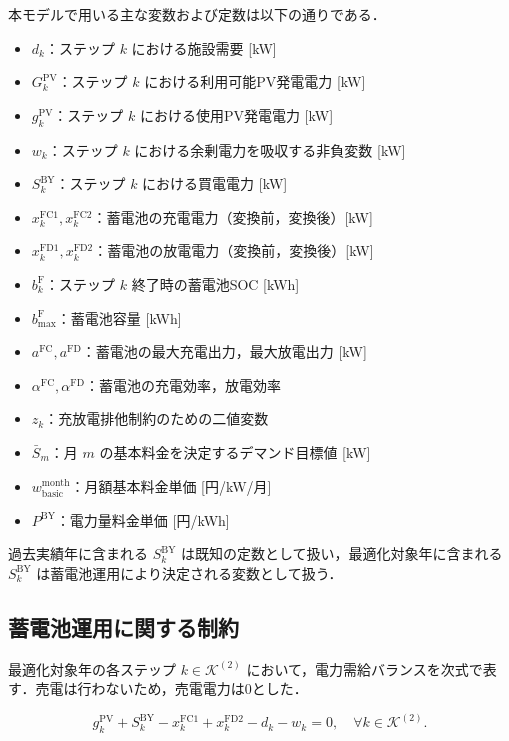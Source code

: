 \documentclass[a4paper,11pt,dvipdfmx]{jsarticle}
\begin{document}
本モデルで用いる主な変数および定数は以下の通りである．

\begin{itemize}
    \item $d_{k}$：ステップ $k$ における施設需要 [kW]
    \item $G^{\mathrm{PV}}_{k}$：ステップ $k$ における利用可能PV発電電力 [kW]
    \item $g^{\mathrm{PV}}_{k}$：ステップ $k$ における使用PV発電電力 [kW]
    \item $w_{k}$：ステップ $k$ における余剰電力を吸収する非負変数 [kW]
    \item $S^{\mathrm{BY}}_{k}$：ステップ $k$ における買電電力 [kW]
    \item $x^{\mathrm{FC1}}_{k}, x^{\mathrm{FC2}}_{k}$：蓄電池の充電電力（変換前，変換後）[kW]
    \item $x^{\mathrm{FD1}}_{k}, x^{\mathrm{FD2}}_{k}$：蓄電池の放電電力（変換前，変換後）[kW]
    \item $b^{\mathrm{F}}_{k}$：ステップ $k$ 終了時の蓄電池SOC [kWh]
    \item $b^{\mathrm{F}}_{\max}$：蓄電池容量 [kWh]
    \item $a^{\mathrm{FC}}, a^{\mathrm{FD}}$：蓄電池の最大充電出力，最大放電出力 [kW]
    \item $\alpha^{\mathrm{FC}}, \alpha^{\mathrm{FD}}$：蓄電池の充電効率，放電効率
    \item $z_{k}$：充放電排他制約のための二値変数
    \item $\bar{S}_{m}$：月 $m$ の基本料金を決定するデマンド目標値 [kW]
    \item $w_{\mathrm{basic}}^{\mathrm{month}}$：月額基本料金単価 [円/kW/月]
    \item $P^{\mathrm{BY}}$：電力量料金単価 [円/kWh]
\end{itemize}

過去実績年に含まれる $S^{\mathrm{BY}}_{k}$ は既知の定数として扱い，最適化対象年に含まれる $S^{\mathrm{BY}}_{k}$ は蓄電池運用により決定される変数として扱う．

\subsection{蓄電池運用に関する制約}
最適化対象年の各ステップ $k \in \mathcal{K}^{(2)}$ において，電力需給バランスを次式で表す．売電は行わないため，売電電力は0とした．

\begin{equation}
    g^{\mathrm{PV}}_{k}
    + S^{\mathrm{BY}}_{k}
    - x^{\mathrm{FC1}}_{k}
    + x^{\mathrm{FD2}}_{k}
    - d_{k}
    - w_{k}
    = 0,
    \quad \forall k \in \mathcal{K}^{(2)}.
\end{equation}
\end{document}
